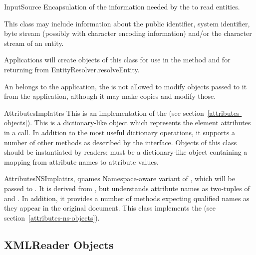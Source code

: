 \begin{classdesc}{InputSource}{}
  Encapsulation of the information needed by the  to
  read entities.

  This class may include information about the public identifier,
  system identifier, byte stream (possibly with character encoding
  information) and/or the character stream of an entity.

  Applications will create objects of this class for use in the
   method and for returning from
  EntityResolver.resolveEntity.

  An  belongs to the application, the
   is not allowed to modify  objects
  passed to it from the application, although it may make copies and
  modify those.
\end{classdesc}

\begin{classdesc}{AttributesImpl}{attrs}
  This is an implementation of the  (see
  section~\ref{attributes-objects}).  This is a dictionary-like
  object which represents the element attributes in a
   call. In addition to the most useful
  dictionary operations, it supports a number of other methods as
  described by the interface. Objects of this class should be
  instantiated by readers;  must be a dictionary-like
  object containing a mapping from attribute names to attribute
  values.
\end{classdesc}

\begin{classdesc}{AttributesNSImpl}{attrs, qnames}
  Namespace-aware variant of , which will be
  passed to . It is derived from
  , but understands attribute names as
  two-tuples of  and . In addition,
  it provides a number of methods expecting qualified names as they
  appear in the original document.  This class implements the
  (see section~\ref{attributes-ns-objects}).
\end{classdesc}


\subsection{XMLReader Objects \label{xmlreader-objects}}

